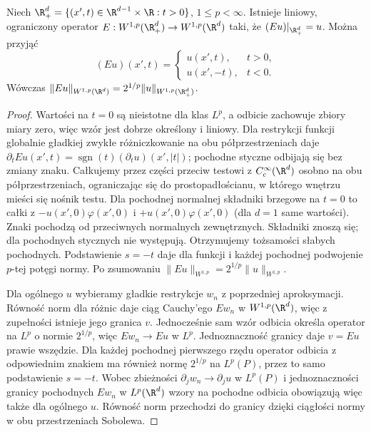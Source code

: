 \begin{twierdzenie}
\label{thm:pde9-reflection}
Niech $\R^d_+=\{(x',t)\in\R^{d-1}\times\R:t>0\}$,
$1\le p<\infty$. Istnieje liniowy, ograniczony operator
$E:W^{1,p}(\R^d_+)\to W^{1,p}(\R^d)$ taki, że
$(Eu)|_{\R^d_+}=u$. Można przyjąć
\[
 (Eu)(x',t)=\begin{cases}u(x',t),&t>0,\\
 u(x',-t),&t<0.\end{cases}
\]
Wówczas $\|Eu\|_{W^{1,p}(\R^d)}=2^{1/p}
\|u\|_{W^{1,p}(\R^d_+)}$.
\end{twierdzenie}
\begin{proof}
Wartości na $t=0$ są nieistotne dla klas $L^p$,
a odbicie zachowuje zbiory miary zero, więc wzór jest
dobrze określony i liniowy.
Dla restrykcji funkcji globalnie gładkiej zwykłe
różniczkowanie na obu półprzestrzeniach daje
$\partial_t Eu(x',t)=\operatorname{sgn}(t)
(\partial_tu)(x',|t|)$; pochodne styczne odbijają się
bez zmiany znaku. Całkujemy przez części przeciw
testowi z $C_c^\infty(\R^d)$ osobno na obu
półprzestrzeniach, ograniczając się do prostopadłościanu,
w którego wnętrzu mieści się nośnik testu.
Dla pochodnej normalnej składniki brzegowe na $t=0$
to całki z $-u(x',0)\varphi(x',0)$ i
$+u(x',0)\varphi(x',0)$ (dla $d=1$ same wartości).
Znaki pochodzą od przeciwnych normalnych zewnętrznych.
Składniki znoszą się; dla pochodnych stycznych nie
występują. Otrzymujemy tożsamości słabych pochodnych.
Podstawienie $s=-t$ daje dla funkcji i każdej pochodnej
podwojenie $p$-tej potęgi normy. Po zsumowaniu
$\|Eu\|_{W^{1,p}}=2^{1/p}\|u\|_{W^{1,p}}$.

Dla ogólnego $u$ wybieramy gładkie restrykcje $w_n$
z poprzedniej aproksymacji. Równość norm dla różnic
daje ciąg Cauchy'ego $Ew_n$ w $W^{1,p}(\R^d)$,
więc z zupełności istnieje jego granica $v$.
Jednocześnie sam wzór odbicia określa operator na $L^p$
o normie $2^{1/p}$, więc $Ew_n\to Eu$ w $L^p$.
Jednoznaczność granicy daje $v=Eu$ prawie wszędzie.
Dla każdej pochodnej pierwszego rzędu operator odbicia
z odpowiednim znakiem ma również normę $2^{1/p}$
na $L^p(P)$, przez to samo podstawienie $s=-t$.
Wobec zbieżności $\partial_j w_n\to\partial_j u$ w $L^p(P)$
i jednoznaczności granicy pochodnych $Ew_n$ w $L^p(\R^d)$
wzory na pochodne odbicia obowiązują więc także dla
ogólnego $u$. Równość norm przechodzi do granicy
dzięki ciągłości normy w obu przestrzeniach Sobolewa.
\end{proof}


